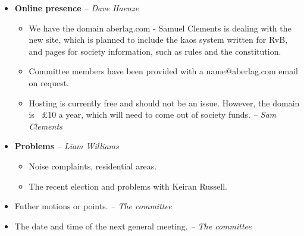 \documentclass{article}
\newcommand{\by}[1]{\hfill {\em-- #1}}
\begin{document}
\begin{itemize}
		\item \textbf{Online presence} \by{Dave Haenze}
		\begin{itemize}
			\item We have the domain aberlag.com - Samuel Clements is dealing with the new site, which is planned to include the kaos system written for RvB, and pages for society information, such as rules and the constitution.
			\item Committee members have been  provided with a name@aberlag.com email on request.
			\item Hosting is currently free and should not be an issue. However, the domain is ~£10 a year, which will need to come out of society funds. \by{Sam Clements}
		\end{itemize}
		
		\item \textbf{Problems} \by{Liam Williams}
		\begin{itemize}
			\item Noise complaints, residential areas.
			\item The recent election and problems with Keiran Russell.
		\end{itemize}
		
		\item Futher motions or points. \by{The committee}
		\item The date and time of the next general meeting. \by{The committee}
	\end{itemize}
\end{document}
